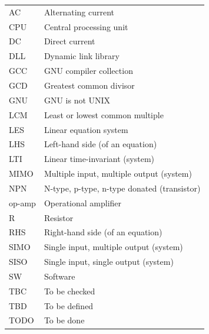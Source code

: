 {\begin{longtable}[c]{|l|l|}
AC      & Alternating current                                  \\
CPU     & Central processing unit                              \\
DC      & Direct current                                       \\
DLL     & Dynamic link library                                 \\
GCC     & GNU compiler collection                              \\
GCD     & Greatest common divisor                              \\
GNU     & GNU is not UNIX                                      \\
LCM     & Least or lowest common multiple                      \\
LES     & Linear equation system                               \\
LHS     & Left-hand side (of an equation)                      \\
LTI     & Linear time-invariant (system)                       \\
MIMO    & Multiple input, multiple output (system)             \\
NPN     & N-type, p-type, n-type donated (transistor)          \\
op-amp  & Operational amplifier                                \\
R       & Resistor                                             \\
RHS     & Right-hand side (of an equation)                     \\
SIMO    & Single input, multiple output (system)               \\
SISO    & Single input, single output (system)                 \\
SW      & Software                                             \\
TBC     & To be checked                                        \\
TBD     & To be defined                                        \\
TODO    & To be done                                           \\
\hline

\end{longtable}
} %


